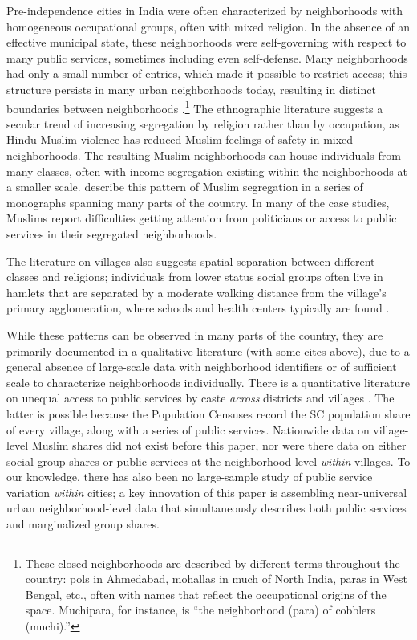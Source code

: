 \documentclass[12pt]{article}
\begin{document}
Pre-independence cities in India were often characterized by neighborhoods with homogeneous occupational groups, often with mixed religion. In the absence of an effective municipal state, these neighborhoods were self-governing with respect to many public services, sometimes including even self-defense. Many neighborhoods had only a small number of entries, which made it possible to restrict access; this structure persists in many urban neighborhoods today, resulting in distinct boundaries between neighborhoods \citep{Gist1957TheComparison,Gould1965LucknowCategory1,Lynch1967RuralDiscontinuities,hdoshi1991,sachdev2002building}.\footnote{These closed neighborhoods are described by different terms throughout the country: pols in Ahmedabad, mohallas in much of North India, paras in West Bengal, etc., often with names that reflect the occupational origins of the space. Muchipara, for instance, is ``the neighborhood (para) of cobblers (muchi).''} The ethnographic literature suggests a secular trend of increasing segregation by religion rather than by occupation, as Hindu-Muslim violence has reduced Muslim feelings of safety in mixed neighborhoods. The resulting Muslim neighborhoods can house individuals from many classes, often with income segregation existing within the neighborhoods at a smaller scale. \citet{jaffrelot2012} describe this pattern of Muslim segregation in a series of monographs spanning many parts of the country. In many of the case studies, Muslims report difficulties getting attention from politicians or access to public services in their segregated neighborhoods.

The literature on villages also suggests spatial separation between different classes and religions; individuals from lower status social groups often live in hamlets that are separated by a moderate walking distance from the village's primary agglomeration, where schools and health centers typically are found \citep{beteille2012,palanpur2018}.

While these patterns can be observed in many parts of the country, they are primarily documented in a qualitative literature (with some cites above), due to a general absence of large-scale data with neighborhood identifiers or of sufficient scale to characterize neighborhoods individually. There is a quantitative literature on unequal access to public services by caste \textit{across} districts \citep{banerjee2007} and villages \citep{bailwal2021}. The latter is possible because the Population Censuses record the SC population share of every village, along with a series of public services. Nationwide data on village-level Muslim shares did not exist before this paper, nor were there data on either social group shares or public services at the neighborhood level \textit{within} villages. To our knowledge, there has also been no large-sample study of public service variation \textit{within} cities; a key innovation of this paper is assembling near-universal urban neighborhood-level data that simultaneously describes both public services and marginalized group shares.
\end{document}
